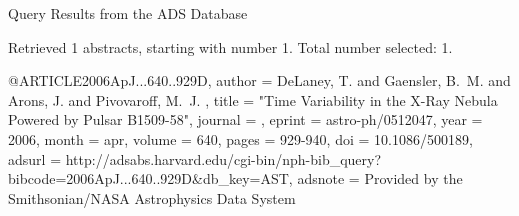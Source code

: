 Query Results from the ADS Database


Retrieved 1 abstracts, starting with number 1.  Total number selected: 1.

@ARTICLE{2006ApJ...640..929D,
   author = {{DeLaney}, T. and {Gaensler}, B.~M. and {Arons}, J. and {Pivovaroff}, M.~J.
	},
    title = "{Time Variability in the X-Ray Nebula Powered by Pulsar B1509-58}",
  journal = {\apj},
   eprint = {astro-ph/0512047},
     year = 2006,
    month = apr,
   volume = 640,
    pages = {929-940},
      doi = {10.1086/500189},
   adsurl = {http://adsabs.harvard.edu/cgi-bin/nph-bib_query?bibcode=2006ApJ...640..929D&db_key=AST},
  adsnote = {Provided by the Smithsonian/NASA Astrophysics Data System}
}


